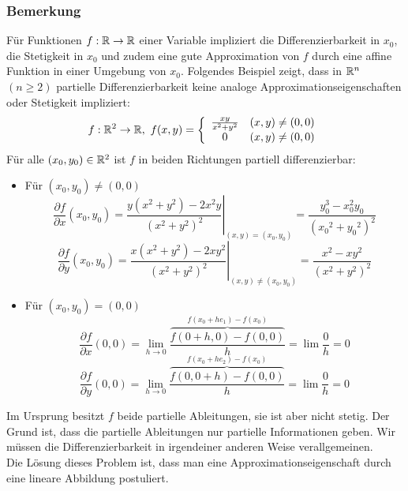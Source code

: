 \subsubsection*{Bemerkung}
Für Funktionen $f:\mathbb{R}\to\mathbb{R}$ einer Variable impliziert die Differenzierbarkeit in $x_0$, die Stetigkeit in $x_0$ und zudem eine gute Approximation von $f$ durch eine affine Funktion in einer Umgebung von $x_0$. Folgendes Beispiel zeigt, dass in $\mathbb{R}^n$ $(n\geq 2)$ partielle Differenzierbarkeit keine analoge Approximationseigenschaften oder Stetigkeit impliziert:
\[f: \R^2 \to\R ,{\text{ }}f(x,y) = \left\{ {\begin{array}{*{20}{c}}
{\frac{{xy}}{{{x^2} + {y^2}}}}&{(x,y)\not  = (0,0)}\\
0&{(x,y)\not  = (0,0)}
\end{array}} \right.\]
Für alle $\left( x_0,y_0\right) \in\mathbb{R}^2$ ist $f$ in beiden Richtungen partiell differenzierbar:
\begin{itemize}
\item Für $\left( x_0,y_0\right)\not=\left( 0,0\right)$ \[\frac{{\partial f}}{{\partial x}}\left( {{x_0},{y_0}} \right) = {\left. {\frac{{y\left( {{x^2} + {y^2}} \right) - 2{x^2}y}}{{{{\left( {{x^2} + {y^2}} \right)}^2}}}} \right|_{(x,y) = \left( {{x_0},{y_0}} \right)}} = \frac{{y_0^3 - x_0^2{y_0}}}{{{{\left( {{x_0}^2 + {y_0}^2} \right)}^2}}}\]
\[\frac{{\partial f}}{{\partial y}}\left( {{x_0},{y_0}} \right) = {\left. {\frac{{x\left( {{x^2} + {y^2}} \right) - 2x{y^2}}}{{{{\left( {{x^2} + {y^2}} \right)}^2}}}} \right|_{(x,y)\not  = \left( {{x_0},{y_0}} \right)}} = \frac{{{x^2} - x{y^2}}}{{{{\left( {{x^2} + {y^2}} \right)}^2}}}\]
\item Für $\left(x_0,y_0\right)=\left( 0,0\right)$\[\frac{{\partial f}}{{\partial x}}(0,0) = \mathop {\lim }\limits_{h \to 0} \frac{{\overbrace {f\left( {0 + h,0} \right) - f\left( {0,0} \right)}^{f({x_0} + h{e_1}) - f(x_0)}}}{h} = \lim \frac{0}{h} = 0\]\[\frac{{\partial f}}{{\partial y}}(0,0) = \mathop {\lim }\limits_{h \to 0} \frac{{\overbrace {f\left( {0,0 + h} \right) - f\left( {0,0} \right)}^{f({x_0} + h{e_2}) - f({x_0})}}}{h} = \lim \frac{0}{h} = 0\]
\end{itemize}
Im Ursprung besitzt $f$ beide partielle Ableitungen, sie ist aber nicht stetig. Der Grund ist, dass die partielle Ableitungen nur partielle Informationen geben. Wir müssen die Differenzierbarkeit in irgendeiner anderen Weise verallgemeinen.\\

Die Lösung dieses Problem ist, dass man eine Approximationseigenschaft durch eine lineare Abbildung postuliert. \\

